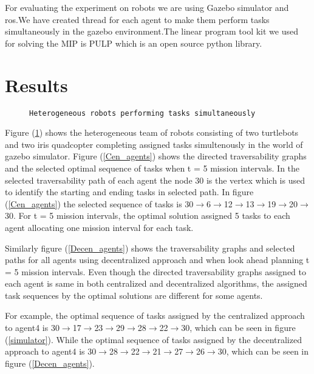 \documentclass[conference]{IEEEtran}
\begin{document}
{For evaluating the experiment on robots we are using Gazebo simulator and ros.We have created thread for each agent to make  them perform tasks simultaneously in the gazebo environment.The linear program tool kit we used for solving the MIP is PULP which is an open source python library. 

\section{Results}
\begin{figure}
\caption{\texttt{Heterogeneous robots performing tasks simultaneously}}\label{simulator1}
\end{figure}

 Figure (\ref{simulator1}) shows the heterogeneous team of robots consisting of two turtlebots and two iris quadcopter completing assigned tasks simultenously in the world of gazebo simulator.
Figure (\ref{Cen_agents}) shows the directed traversability graphs and the selected optimal sequence of tasks when t = 5 mission intervals. In the selected traversability path of each agent the node 30 is the vertex which is used to identify the starting and ending tasks in selected path. In figure (\ref{Cen_agents}) the selected sequence of tasks is 30\(\rightarrow\)6\(\rightarrow\)12\(\rightarrow\)13\(\rightarrow\)19\(\rightarrow\)20\(\rightarrow\)30. For t = 5 mission intervals, the optimal solution assigned 5 tasks to each agent allocating one mission interval for each task.

Similarly figure (\ref{Decen_agents}) shows the traversability graphs and selected paths for all agents using decentralized approach and when look ahead planning t = 5 mission intervals. Even though the directed traversability graphs assigned to each agent is same in both centralized and decentralized algorithms, the assigned task sequences by the optimal solutions are different for some agents.

For example, the optimal sequence of tasks assigned by the centralized approach to agent4 is 30\(\rightarrow\)17\(\rightarrow\)23\(\rightarrow\)29\(\rightarrow\)28\(\rightarrow\)22\(\rightarrow\)30, which can be seen in figure (\ref{simulator}). While the optimal sequence of tasks assigned by the decentralized approach to agent4 is 30\(\rightarrow\)28\(\rightarrow\)22\(\rightarrow\)21\(\rightarrow\)27\(\rightarrow\)26\(\rightarrow\)30, which can be seen in figure (\ref{Decen_agents}).

}
\end{document}
